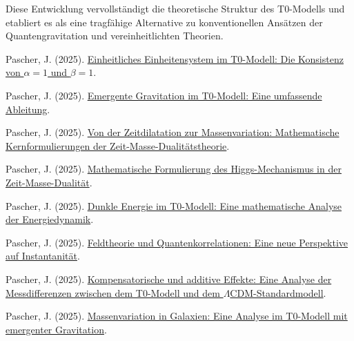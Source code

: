 \documentclass[12pt,a4paper]{article}
\begin{document}
	Diese Entwicklung vervollständigt die theoretische Struktur des T0-Modells und etabliert es als eine tragfähige Alternative zu konventionellen Ansätzen der Quantengravitation und vereinheitlichten Theorien.
	
	\begin{thebibliography}{99}
		 Pascher, J. (2025). \href{https://github.com/jpascher/T0-Time-Mass-Duality/tree/main/2/pdf/Deutsch/Alpha1Beta1Konsistenz.pdf}{Einheitliches Einheitensystem im T0-Modell: Die Konsistenz von $\alpha = 1$ und $\beta = 1$}.
		
		 Pascher, J. (2025). \href{https://github.com/jpascher/T0-Time-Mass-Duality/tree/main/2/pdf/Deutsch/EmergentGravT0.pdf}{Emergente Gravitation im T0-Modell: Eine umfassende Ableitung}.
		
		 Pascher, J. (2025). \href{https://github.com/jpascher/T0-Time-Mass-Duality/tree/main/2/pdf/Deutsch/MathZeitMasseLagrange.pdf}{Von der Zeitdilatation zur Massenvariation: Mathematische Kernformulierungen der Zeit-Masse-Dualitätstheorie}.
		
		 Pascher, J. (2025). \href{https://github.com/jpascher/T0-Time-Mass-Duality/tree/main/2/pdf/Deutsch/MathHiggsZeitMasse.pdf}{Mathematische Formulierung des Higgs-Mechanismus in der Zeit-Masse-Dualität}.
		
		 Pascher, J. (2025). \href{https://github.com/jpascher/T0-Time-Mass-Duality/tree/main/2/pdf/Deutsch/MathEnergiedynamik.pdf}{Dunkle Energie im T0-Modell: Eine mathematische Analyse der Energiedynamik}.
		
		 Pascher, J. (2025). \href{https://github.com/jpascher/T0-Time-Mass-Duality/tree/main/2/pdf/Deutsch/FeldtheorieQuanten.pdf}{Feldtheorie und Quantenkorrelationen: Eine neue Perspektive auf Instantanität}.
		
		 Pascher, J. (2025). \href{https://github.com/jpascher/T0-Time-Mass-Duality/tree/main/2/pdf/Deutsch/MessdifferenzenT0Standard.pdf}{Kompensatorische und additive Effekte: Eine Analyse der Messdifferenzen zwischen dem T0-Modell und dem $\Lambda$CDM-Standardmodell}.
		
		 Pascher, J. (2025). \href{https://github.com/jpascher/T0-Time-Mass-Duality/tree/main/2/pdf/Deutsch/MassVarGalaxien.pdf}{Massenvariation in Galaxien: Eine Analyse im T0-Modell mit emergenter Gravitation}.
		

\end{thebibliography}
\end{document}
